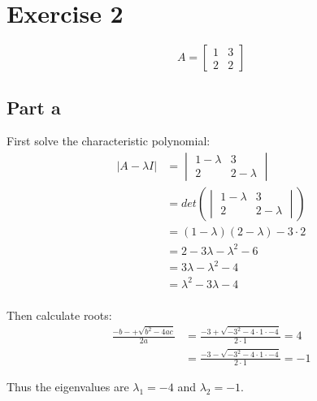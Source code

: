 \section{Exercise 2}
\[
	A = \begin{bmatrix} 1 & 3 \\ 2 & 2 \end{bmatrix}
\]

\subsection{Part a}
First solve the characteristic polynomial:
\begin{align*}
	|A-\lambda I| & = \begin{vmatrix}
		                  1-\lambda & 3         \\
		                  2         & 2-\lambda
	                  \end{vmatrix}             \\
	              & = det\left(\begin{vmatrix}
		                           1-\lambda & 3         \\
		                           2         & 2-\lambda
	                           \end{vmatrix}\right)    \\
	              & = (1-\lambda)(2-\lambda) - 3\cdot 2 \\
	              & = 2 - 3\lambda - \lambda^2 - 6      \\
	              & = 3\lambda - \lambda^2 - 4          \\
	              & = \lambda^2 - 3\lambda - 4          \\
\end{align*}

Then calculate roots:
\begin{align*}
	\frac{-b -+ \sqrt{b^2-4ac}}{2a} & = \frac{-3 + \sqrt{-3^2-4\cdot 1\cdot -4}}{2\cdot 1} = 4  \\
	                                & = \frac{-3 - \sqrt{-3^2-4\cdot 1\cdot -4}}{2\cdot 1} = -1
\end{align*}

Thus the eigenvalues are $\lambda_1 = -4$ and $\lambda_2 = -1$.

